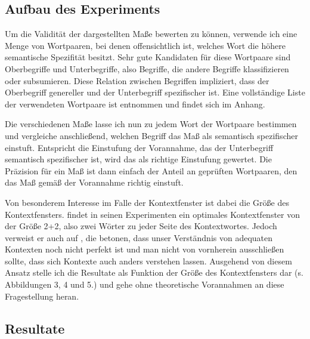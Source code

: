 \documentclass[11pt,numbers=noenddot]{scrartcl}
\begin{document}
\subsection{Aufbau des Experiments} \label{aufbau}

Um die Validität der dargestellten Maße bewerten zu können, verwende ich eine Menge von Wortpaaren, bei denen offensichtlich ist, welches Wort die höhere semantische Spezifität besitzt. Sehr gute Kandidaten für diese Wortpaare sind Oberbegriffe und Unterbegriffe, also Begriffe, die andere Begriffe klassifizieren oder subsumieren. Diese Relation zwischen Begriffen impliziert, dass der Oberbegriff genereller und der Unterbegriff spezifischer ist. Eine vollständige Liste der verwendeten Wortpaare ist \citet{Caraballo99determiningthe} entnommen und findet sich im Anhang.

Die verschiedenen Maße lasse ich nun zu jedem Wort der Wortpaare bestimmen und vergleiche anschließend, welchen Begriff das Maß als semantisch spezifischer einstuft. Entspricht die Einstufung der Vorannahme, das der Unterbegriff semantisch spezifischer ist, wird das als richtige Einstufung gewertet. Die Präzision für ein Maß ist dann einfach der Anteil an geprüften Wortpaaren, den das Maß gemäß der Vorannahme richtig einstuft.

Von besonderem Interesse im Falle der Kontextfenster ist dabei die Größe des Kontextfensters. \citet[S. 68]{sahlgren2006word} findet in seinen Experimenten ein optimales Kontextfenster von der Größe 2+2, also zwei Wörter zu jeder Seite des Kontextwortes. Jedoch verweist er auch auf \citet{Miller2000-MILLRF}, die betonen, dass unser Verständnis von adequaten Kontexten noch nicht perfekt ist und man nicht von vornherein ausschließen sollte, dass sich Kontexte auch anders verstehen lassen. Ausgehend von diesem Ansatz stelle ich die Resultate als Funktion der Größe des Kontextfensters dar (s. Abbildungen 3, 4 und 5.) und gehe ohne theoretische Vorannahmen an diese Fragestellung heran.

\subsection{Resultate}
\end{document}
